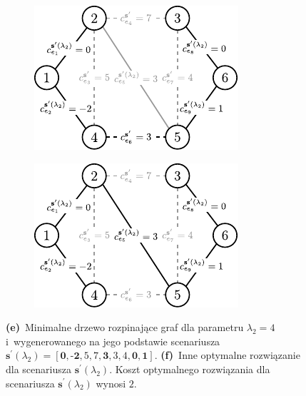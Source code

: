 \begin{figure}[!htbp]
	\ContinuedFloat
	\null\hfill
	\begin{subfigure}[b]{0.32\textwidth}
		\includegraphics[width=\textwidth]{Chapter_IV/INC-MST-example/d1}
		\caption{}
		\label{fig:imstExample:e}
	\end{subfigure}
	\hfill
	\begin{subfigure}[b]{0.32\textwidth}
		\includegraphics[width=\textwidth]{Chapter_IV/INC-MST-example/d2}
		\caption{}
		\label{fig:imstExample:f}
	\end{subfigure}
	\hfill\null
	\caption{
		\textbf{(e)}~Minimalne drzewo rozpinające graf dla parametru $\lambda_{2} = 4$ i~wygenerowanego na jego podstawie scenariusza $\textbf{s}^{\prime} \left( \lambda_{2} \right) = \left[ \textbf{0}, \textbf{-2}, 5, 7, \textbf{3}, 3, 4, \textbf{0}, \textbf{1} \right]$.
		\textbf{(f)}~Inne optymalne rozwiązanie dla scenariusza $\textbf{s}^{\prime} \left( \lambda_{2} \right)$.
		Koszt optymalnego rozwiązania dla scenariusza $\textbf{s}^{\prime} \left( \lambda_{2} \right)$ wynosi $2$.
	}
	\label{fig:imstExample}
\end{figure}

